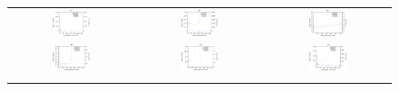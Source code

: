 \documentclass[preprint,3p]{elsarticle}
\begin{document}
\begin{figure}[!t]
\begin{tabular}{ccc}
  \includegraphics[width=0.32\textwidth]{images/HighMutRatio_150000/F11_50_HighMutRatio} & \includegraphics[width=0.32\textwidth]{images/HighMutRatio_150000/F12_50_HighMutRatio} & \includegraphics[width=0.32\textwidth]{images/HighMutRatio_150000/F13_50_HighMutRatio} \\
  \includegraphics[width=0.32\textwidth]{images/HighMutRatio_150000/F14_50_HighMutRatio} & \includegraphics[width=0.32\textwidth]{images/HighMutRatio_150000/F15_50_HighMutRatio} & \includegraphics[width=0.32\textwidth]{images/HighMutRatio_150000/F16_50_HighMutRatio} \\ \\

\end{tabular}
\end{figure}
\end{document}
